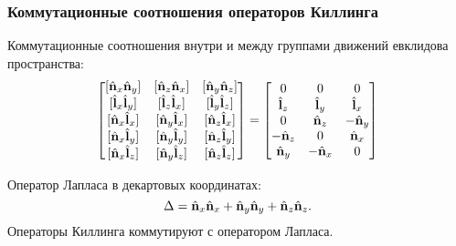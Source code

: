 \documentclass{beamer}
\begin{document}
    \begin{frame}\frametitle{Коммутационные соотношения операторов Киллинга}

        Коммутационные соотношения внутри и между группами движений евклидова пространства:
        \begin{equation}
            \begin{bmatrix}
                [ \Op{n}_x \Op{n}_y ] & [ \Op{n}_z \Op{n}_x ] & [ \Op{n}_y \Op{n}_z ] \\
                [ \Op{l}_x \Op{l}_y ] & [ \Op{l}_z \Op{l}_x ] & [ \Op{l}_y \Op{l}_z ] \\
                [ \Op{n}_x \Op{l}_x ] & [ \Op{n}_y \Op{l}_x ] & [ \Op{n}_z \Op{l}_x ] \\
                [ \Op{n}_x \Op{l}_y ] & [ \Op{n}_y \Op{l}_y ] & [ \Op{n}_z \Op{l}_y ] \\
                [ \Op{n}_x \Op{l}_z ] & [ \Op{n}_y \Op{l}_z ] & [ \Op{n}_z \Op{l}_z ]
            \end{bmatrix}
            =
            \begin{bmatrix}
                0          &   0        &   0        \\
                \Op{l}_z   &   \Op{l}_y &   \Op{l}_x \\
                0          &   \Op{n}_z & - \Op{n}_y \\
                - \Op{n}_z &   0        &   \Op{n}_x \\
                \Op{n}_y   & - \Op{n}_x &   0
            \end{bmatrix}
        \end{equation}

        Оператор Лапласа в декартовых координатах:
        \begin{equation}
            \Delta = \hat{\mathbf{n}}_x\hat{\mathbf{n}}_x + \hat{\mathbf{n}}_y\hat{\mathbf{n}}_y + \hat{\mathbf{n}}_z\hat{\mathbf{n}}_z .
        \end{equation}
        Операторы Киллинга коммутируют с оператором Лапласа.

    \end{frame}

\end{document}
